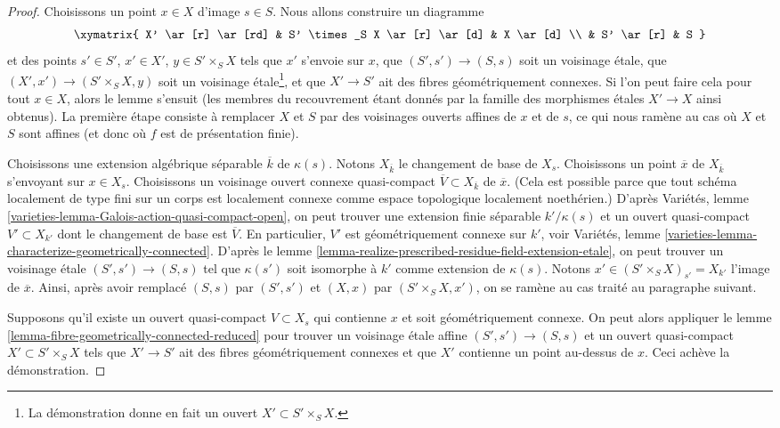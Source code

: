 \begin{proof}
Choisissons un point $x \in X$ d'image $s \in S$. Nous allons construire
un diagramme
$$
\xymatrix{
X' \ar[r] \ar[rd] & S' \times_S X \ar[r] \ar[d] & X \ar[d] \\
& S' \ar[r] & S
}
$$
et des points $s' \in S'$, $x' \in X'$, $y \in S' \times_S X$
tels que $x'$ s'envoie sur $x$, que $(S', s') \to (S, s)$
soit un voisinage \'etale, que $(X', x') \to (S' \times_S X, y)$
soit un voisinage \'etale\footnote{La démonstration donne en fait
un ouvert $X' \subset S' \times_S X$.}, et que
$X' \to S'$ ait des fibres géométriquement
connexes. Si l'on peut faire cela pour tout $x \in X$, alors
le lemme s'ensuit (les membres du recouvrement étant donnés par la
famille des morphismes \'etales $X' \to X$ ainsi obtenus).
La première étape consiste à remplacer $X$ et $S$ par des voisinages ouverts affines
de $x$ et de $s$, ce qui nous ramène au cas où $X$ et $S$ sont affines
(et donc où $f$ est de présentation finie).

\medskip\noindent
Choisissons une extension algébrique séparable $\overline{k}$ de $\kappa(s)$.
Notons $X_{\overline{k}}$ le changement de base de $X_s$.
Choisissons un point $\overline{x}$ de $X_{\overline{k}}$ s'envoyant sur $x \in X_s$.
Choisissons un voisinage ouvert connexe quasi-compact
$\overline{V} \subset X_{\overline{k}}$
de $\overline{x}$. (Cela est possible parce que tout schéma
localement de type fini sur un corps est localement connexe
comme espace topologique localement noethérien.)
D'après Variétés, lemme \ref{varieties-lemma-Galois-action-quasi-compact-open},
on peut trouver une extension finie séparable $k'/\kappa(s)$
et un ouvert quasi-compact $V' \subset X_{k'}$ dont le
changement de base est $\overline{V}$. En particulier, $V'$ est
géométriquement connexe sur $k'$, voir
Variétés, lemme \ref{varieties-lemma-characterize-geometrically-connected}. D'après
le lemme \ref{lemma-realize-prescribed-residue-field-extension-etale},
on peut trouver un voisinage \'etale $(S', s') \to (S, s)$
tel que $\kappa(s')$ soit isomorphe à $k'$ comme extension
de $\kappa(s)$.
Notons $x' \in (S' \times_S X)_{s'} = X_{k'}$ l'image de $\overline{x}$.
Ainsi, après avoir remplacé $(S, s)$ par $(S', s')$ et $(X, x)$ par
$(S' \times_S X, x')$, on se ramène au cas traité au
paragraphe suivant.

\medskip\noindent
Supposons qu'il existe un ouvert quasi-compact $V \subset X_s$
qui contienne $x$ et soit géométriquement connexe.
On peut alors appliquer le lemme \ref{lemma-fibre-geometrically-connected-reduced}
pour trouver un voisinage \'etale affine $(S', s') \to (S, s)$
et un ouvert quasi-compact $X' \subset S' \times_S X$ tels que
$X' \to S'$ ait des fibres géométriquement connexes
et que $X'$ contienne un point au-dessus de $x$.
Ceci achève la démonstration.
\end{proof}

